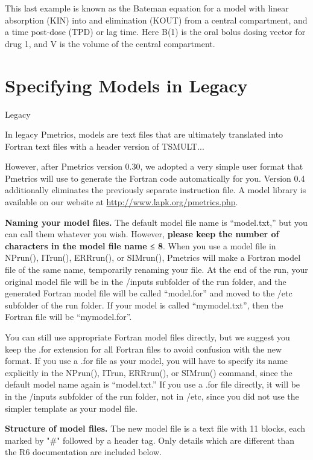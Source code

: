 \documentclass[
]{book}
\begin{document}
This last example is known as the Bateman equation for a model with
linear absorption (KIN) into and elimination (KOUT) from a central
compartment, and a time post-dose (TPD) or lag time. Here B(1) is the
oral bolus dosing vector for drug 1, and V is the volume of the central
compartment.

\hypertarget{specifying-models-in-legacy}{%
\section{Specifying Models in Legacy}\label{specifying-models-in-legacy}}

{Legacy}

In legacy Pmetrics, models are text files that are ultimately translated into Fortran text files with a header version of TSMULT...

However, after Pmetrics version 0.30, we adopted a
very simple user format that Pmetrics will use to generate the Fortran
code automatically for you. Version 0.4 additionally eliminates the
previously separate instruction file. A model library is available on
our website at
\url{http://www.lapk.org/pmetrics.php}.

\textbf{Naming your model files.} The default model file name is ``model.txt,''
but you can call them whatever you wish. However, \textbf{please keep the
number of characters in the model file name ≤ 8}. When you use a model
file in NPrun(), ITrun(), ERRrun(), or SIMrun(), Pmetrics will make a
Fortran model file of the same name, temporarily renaming your file. At
the end of the run, your original model file will be in the /inputs
subfolder of the run folder, and the generated Fortran model file will
be called ``model.for'' and moved to the /etc subfolder of the run folder.
If your model is called ``mymodel.txt'', then the Fortran file will be
``mymodel.for''.

You can still use appropriate Fortran model files directly, but we
suggest you keep the .for extension for all Fortran files to avoid
confusion with the new format. If you use a .for file as your model, you
will have to specify its name explicitly in the NPrun(), ITrun,
ERRrun(), or SIMrun() command, since the default model name again is
``model.txt.'' If you use a .for file directly, it will be in the /inputs
subfolder of the run folder, not in /etc, since you did not use the
simpler template as your model file.

\textbf{Structure of model files.} The new model file is a text file with 11
blocks, each marked by "\#" followed by a header tag. Only details which are different than the R6 documentation are included below.
\end{document}
